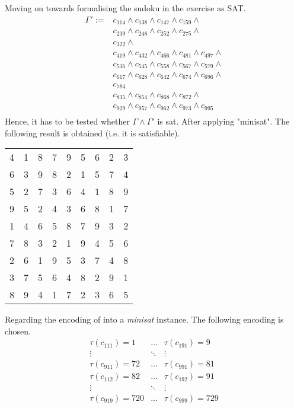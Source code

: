\documentclass[11pt,a4paper]{article}
\begin{document}
Moving on towards formalising the sudoku in the exercise as SAT.
\begin{equation*}
\begin{split}
\Gamma':=& c_{114} \land c_{138} \land c_{147} \land c_{159} \land \\
& c_{239} \land c_{248} \land c_{252} \land c_{275} \land \\
& c_{322} \land \\
& c_{419} \land c_{432} \land c_{466} \land c_{481} \land c_{497} \land \\
& c_{536} \land c_{545} \land c_{558} \land c_{567} \land c_{579} \land \\
& c_{617} \land c_{628} \land c_{642} \land c_{674} \land c_{696} \land \\
& c_{784}  \\
& c_{835} \land c_{854} \land c_{868} \land c_{872} \land \\
& c_{929} \land c_{957} \land c_{962} \land c_{973} \land c_{995} \\
\end{split}
\end{equation*}
Hence, it has to be tested whether $\Gamma \land \Gamma'$ is sat. After applying "minisat". The following result is obtained (i.e. it is satisfiable).
\begin{center}
\begin{tabular}{| ccc | ccc | ccc |}
\hline
  4 &  1 &  8 &  7 &  9 &  5 &  6 &  2 &  3 \\
  6 &  3 &  9 &  8 &  2 &  1 &  5 &  7 &  4 \\
  5 &  2 &  7 &  3 &  6 &  4 &  1 &  8 &  9 \\
  \hline
  9 &  5 &  2 &  4 &  3 &  6 &  8 &  1 &  7 \\
  1 &  4 &  6 &  5 &  8 &  7 &  9 &  3 &  2 \\
  7 &  8 &  3 &  2 &  1 &  9 &  4 &  5 &  6 \\
  \hline
  2 &  6 &  1 &  9 &  5 &  3 &  7 &  4 &  8 \\
  3 &  7 &  5 &  6 &  4 &  8 &  2 &  9 &  1 \\
  8 &  9 &  4 &  1 &  7 &  2 &  3 &  6 &  5 \\
\hline
\end{tabular}
\end{center}

Regarding the encoding of into a \emph{minisat} instance. The following encoding is chosen.
\begin{equation*}
\begin{array}{ccc}
\tau(c_{111})=1 &\dots&  \tau(c_{191})=9  \\
\vdots &\ddots & \vdots \\
\tau(c_{911})=72 &\dots&  \tau(c_{991})=81  \\
\tau(c_{112})=82 &\dots&  \tau(c_{192})=91  \\
\vdots &\ddots & \vdots \\
\tau(c_{919})=720 &\dots&  \tau(c_{999})=729  \\
\end{array}
\end{equation*}
\end{document}
